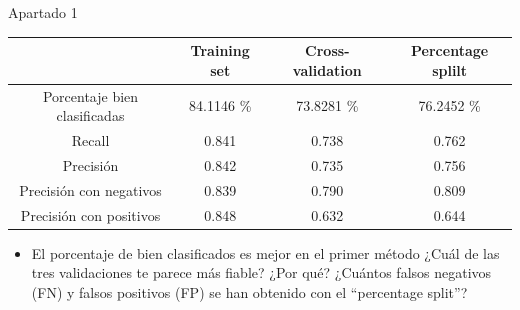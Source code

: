 \documentclass[11pt, a4paper, spanish, openright, twoside]{book}
\begin{document}
\begin{section}{Apartado 1}
\begin{itemize}
		\begin{center}
 			 \begin{tabular}{| c | c | c | c |}
 			   \hline
			     				       	  & Training set 	& Cross-validation 		& Percentage splilt  \\ \hline
			    Porcentaje bien clasificadas  	  & 84.1146 \% 	& 73.8281 \%		& 76.2452 \% \\ \hline			 
			    Recall 			     	  & 0.841  		& 0.738 			& 0.762 \\ \hline 
			    Precisión			      	  & 0.842  		& 0.735 			& 0.756  \\ \hline \hline
			    Precisión con negativos		  & 0.839		& 0.790			& 0.809 \\ \hline
			    Precisión con positivos 		  & 0.848 		& 0.632			& 0.644 \\ 
			    \hline
			  \end{tabular}
		\end{center}

		\begin{itemize}
			 \item El porcentaje de bien clasificados es mejor en el primer método ¿Cuál de las tres validaciones te parece 
			más fiable? ¿Por qué? ¿Cuántos falsos negativos (FN) y falsos positivos (FP) se han obtenido con el 
			“percentage split”? 
		\end{itemize}
	

	\end{itemize}
\end{section}
\end{document}
